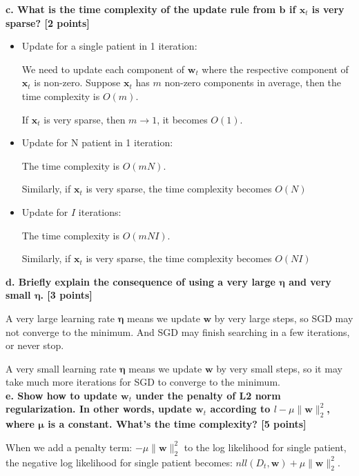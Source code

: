 \documentclass[12pt]{article}
\begin{document}
\textbf{c. What is the time complexity of the update rule from $\mathbf{b}$ if $\mathbf{x}_t$ is very sparse? [2 points]}
\begin{itemize}

\item Update for a single patient in 1 iteration:

We need to update each component of $\mathbf{w}_t$ where the respective component of $\mathbf{x}_t$ is non-zero. Suppose  $\mathbf{x}_t$ has $m$ non-zero components in average, then the time complexity is $O(m)$.

If $\mathbf{x}_t$ is very sparse, then $m \rightarrow 1$, it becomes $O(1)$.

\item Update for N patient in 1 iteration:

The time complexity is $O(m N)$.

Similarly, if $\mathbf{x}_t$ is very sparse, the time complexity becomes $O(N)$

\item Update for $I$ iterations:

The time complexity is $O(m N I )$.

Similarly, if $\mathbf{x}_t$ is very sparse, the time complexity becomes $O(N I)$\\
\end{itemize}



\textbf{d. Briefly explain the consequence of using a very large $\mathbf{\eta}$ and very small $\mathbf{\eta}$. [3 points]}


A very large learning rate $\mathbf{\eta}$ means we update $\mathbf{w}$ by very large steps, so SGD may not converge to the minimum. And SGD may finish searching in a few iterations, or never stop.

A very small learning rate $\mathbf{\eta}$ means we update $\mathbf{w}$ by very small steps, so it may take much more iterations for SGD to converge to the minimum.\\


\textbf{e. Show how to update $\mathbf{w}_t$ under the penalty of L2 norm regularization. In other words, update $\mathbf{w}_t$ according to $l - \mu \|\mathbf{w}\|_2^2 $, where $\mathbf{\mu}$ is a constant. What's the time complexity? [5 points]}

When we add a penalty term: $- \mu \|\mathbf{w}\|_2^2 $ to the log likelihood for single patient, the negative log likelihood for single patient becomes: $nll\left (D_t, \mathbf{w} \right ) + \mu \|\mathbf{w}\|_2^2 $.
\end{document}
